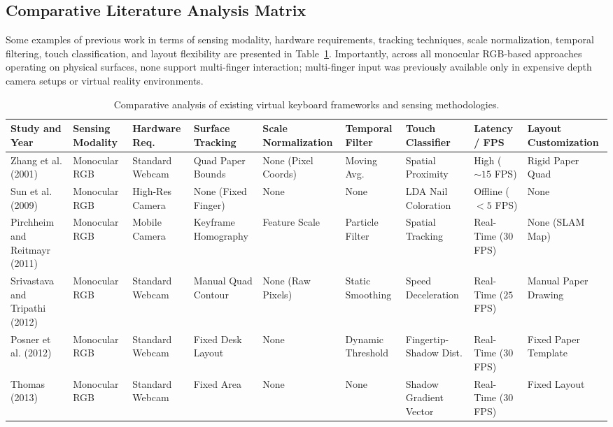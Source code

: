 \subsection{Comparative Literature Analysis Matrix}
\label{subsec:lit_comparative_matrix}
Some examples of previous work in terms of sensing modality, hardware requirements, tracking techniques, scale normalization, temporal filtering, touch classification, and layout flexibility are presented in Table~\ref{tab:lit_comparative_matrix}. Importantly, across all monocular RGB-based approaches operating on physical surfaces, none support multi-finger interaction; multi-finger input was previously available only in expensive depth camera setups or virtual reality environments.

\begin{table}[htbp]
\centering
\caption{Comparative analysis of existing virtual keyboard frameworks and sensing methodologies.}
\label{tab:lit_comparative_matrix}
\begin{tabular}{l l l l l l l l l}
\toprule
\textbf{Study and Year} & \textbf{Sensing Modality} & \textbf{Hardware Req.} & \textbf{Surface Tracking} & \textbf{Scale Normalization} & \textbf{Temporal Filter} & \textbf{Touch Classifier} & \textbf{Latency / FPS} & \textbf{Layout Customization} \\
\midrule
Zhang et al. (2001) \cite{Zhang2001Visual} & Monocular RGB & Standard Webcam & Quad Paper Bounds & None (Pixel Coords) & Moving Avg. & Spatial Proximity & High ($\sim 15$ FPS) & Rigid Paper Quad \\
Sun et al. (2009) \cite{Sun2009Estimation} & Monocular RGB & High-Res Camera & None (Fixed Finger) & None & None & LDA Nail Coloration & Offline ($< 5$ FPS) & None \\
Pirchheim and Reitmayr (2011) \cite{Pirchheim2011Homography} & Monocular RGB & Mobile Camera & Keyframe Homography & Feature Scale & Particle Filter & Spatial Tracking & Real-Time ($30$ FPS) & None (SLAM Map) \\
Srivastava and Tripathi (2012) \cite{Srivastava2012RealTime} & Monocular RGB & Standard Webcam & Manual Quad Contour & None (Raw Pixels) & Static Smoothing & Speed Deceleration & Real-Time ($25$ FPS) & Manual Paper Drawing \\
Posner et al. (2012) \cite{Posner2012Single} & Monocular RGB & Standard Webcam & Fixed Desk Layout & None & Dynamic Threshold & Fingertip-Shadow Dist. & Real-Time ($30$ FPS) & Fixed Paper Template \\
Thomas (2013) \cite{Thomas2013Camera} & Monocular RGB & Standard Webcam & Fixed Area & None & None & Shadow Gradient Vector & Real-Time ($30$ FPS) & Fixed Layout \\

\end{tabular}
\end{table}
